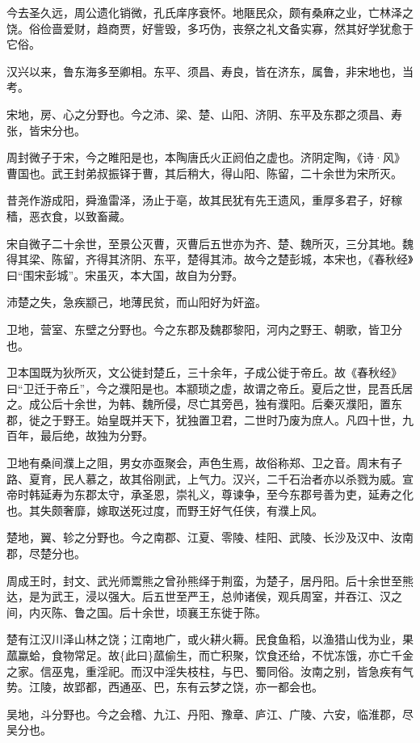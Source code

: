 \documentclass[]{article}
\begin{document}
今去圣久远，周公遗化销微，孔氏庠序衰怀。地陿民众，颇有桑麻之业，亡林泽之饶。俗俭啬爱财，趋商贾，好訾毁，多巧伪，丧祭之礼文备实寡，然其好学犹愈于它俗。

汉兴以来，鲁东海多至卿相。东平、须昌、寿良，皆在济东，属鲁，非宋地也，当考。

宋地，房、心之分野也。今之沛、梁、楚、山阳、济阴、东平及东郡之须昌、寿张，皆宋分也。

周封微子于宋，今之睢阳是也，本陶唐氏火正阏伯之虚也。济阴定陶，《诗·风》曹国也。武王封弟叔振铎于曹，其后稍大，得山阳、陈留，二十余世为宋所灭。

昔尧作游成阳，舜渔雷泽，汤止于亳，故其民犹有先王遗风，重厚多君子，好稼穑，恶衣食，以致畜藏。

宋自微子二十余世，至景公灭曹，灭曹后五世亦为齐、楚、魏所灭，三分其地。魏得其梁、陈留，齐得其济阴、东平，楚得其沛。故今之楚彭城，本宋也，《春秋经》曰``围宋彭城''。宋虽灭，本大国，故自为分野。

沛楚之失，急疾颛己，地薄民贫，而山阳好为奸盗。

卫地，营室、东壁之分野也。今之东郡及魏郡黎阳，河内之野王、朝歌，皆卫分也。

卫本国既为狄所灭，文公徙封楚丘，三十余年，子成公徙于帝丘。故《春秋经》曰``卫迁于帝丘''，今之濮阳是也。本颛琐之虚，故谓之帝丘。夏后之世，昆吾氏居之。成公后十余世，为韩、魏所侵，尽亡其旁邑，独有濮阳。后秦灭濮阳，置东郡，徙之于野王。始皇既并天下，犹独置卫君，二世时乃废为庶人。凡四十世，九百年，最后绝，故独为分野。

卫地有桑间濮上之阻，男女亦亟聚会，声色生焉，故俗称郑、卫之音。周末有子路、夏育，民人慕之，故其俗刚武，上气力。汉兴，二千石治者亦以杀戮为威。宣帝时韩延寿为东郡太守，承圣恩，崇礼义，尊谏争，至今东郡号善为吏，延寿之化也。其失颇奢靡，嫁取送死过度，而野王好气任侠，有濮上风。

楚地，翼、轸之分野也。今之南郡、江夏、零陵、桂阳、武陵、长沙及汉中、汝南郡，尽楚分也。

周成王时，封文、武光师鬻熊之曾孙熊绎于荆蛮，为楚子，居丹阳。后十余世至熊达，是为武王，浸以强大。后五世至严王，总帅诸侯，观兵周室，并吞江、汉之间，内灭陈、鲁之国。后十余世，顷襄王东徙于陈。

楚有江汉川泽山林之饶；江南地广，或火耕火耨。民食鱼稻，以渔猎山伐为业，果蓏蠃蛤，食物常足。故\{此曰\}蓏偷生，而亡积聚，饮食还给，不忧冻饿，亦亡千金之家。信巫鬼，重淫祀。而汉中淫失枝柱，与巴、蜀同俗。汝南之别，皆急疾有气势。江陵，故郢都，西通巫、巴，东有云梦之饶，亦一都会也。

吴地，斗分野也。今之会稽、九江、丹阳、豫章、庐江、广陵、六安，临淮郡，尽吴分也。
\end{document}
